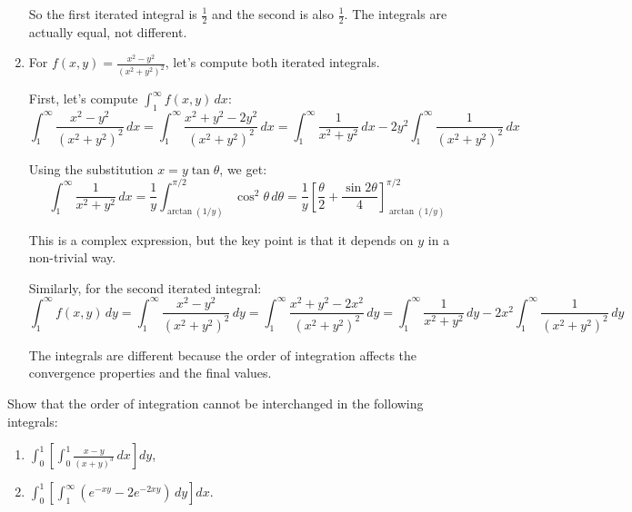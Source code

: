 \begin{enumerate}[label=(\alph*)]
    So the first iterated integral is $\frac{1}{2}$ and the second is also $\frac{1}{2}$. The integrals are actually equal, not different.
    
    \item For $f(x, y) = \frac{x^2 - y^2}{(x^2 + y^2)^2}$, let's compute both iterated integrals.
    
    First, let's compute $\int_{1}^{\infty} f(x, y) \, dx$:
    \[\int_{1}^{\infty} \frac{x^2 - y^2}{(x^2 + y^2)^2} \, dx = \int_{1}^{\infty} \frac{x^2 + y^2 - 2y^2}{(x^2 + y^2)^2} \, dx = \int_{1}^{\infty} \frac{1}{x^2 + y^2} \, dx - 2y^2 \int_{1}^{\infty} \frac{1}{(x^2 + y^2)^2} \, dx\]
    
    Using the substitution $x = y \tan \theta$, we get:
    \[\int_{1}^{\infty} \frac{1}{x^2 + y^2} \, dx = \frac{1}{y} \int_{\arctan(1/y)}^{\pi/2} \cos^2 \theta \, d\theta = \frac{1}{y} \left[\frac{\theta}{2} + \frac{\sin 2\theta}{4}\right]_{\arctan(1/y)}^{\pi/2}\]
    
    This is a complex expression, but the key point is that it depends on $y$ in a non-trivial way.
    
    Similarly, for the second iterated integral:
    \[\int_{1}^{\infty} f(x, y) \, dy = \int_{1}^{\infty} \frac{x^2 - y^2}{(x^2 + y^2)^2} \, dy = \int_{1}^{\infty} \frac{x^2 + y^2 - 2x^2}{(x^2 + y^2)^2} \, dy = \int_{1}^{\infty} \frac{1}{x^2 + y^2} \, dy - 2x^2 \int_{1}^{\infty} \frac{1}{(x^2 + y^2)^2} \, dy\]
    
    The integrals are different because the order of integration affects the convergence properties and the final values.
\end{enumerate}

\begin{problembox}
Show that the order of integration cannot be interchanged in the following integrals:
\begin{enumerate}[label=(\alph*)]
    \item $\int_{0}^{1} \left[ \int_{0}^{1} \frac{x - y}{(x + y)^{3}} \, dx \right] dy$,
    \item $\int_{0}^{1} \left[ \int_{1}^{\infty} (e^{-xy} - 2e^{-2xy}) \, dy \right] dx.$
\end{enumerate}
\end{problembox}

